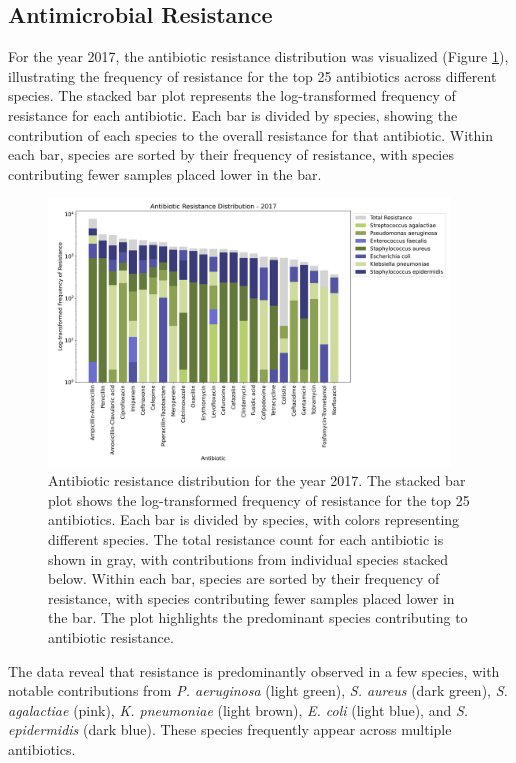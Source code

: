 \documentclass[english,11pt,a4paper,titlepage]{article}
\begin{document}
\subsection*{Antimicrobial Resistance}
For the year 2017, the antibiotic resistance distribution was visualized (Figure \ref{fig:antibiotic_resistance_distribution}), illustrating the frequency of resistance for the top 25 antibiotics across different species. The stacked bar plot represents the log-transformed frequency of resistance for each antibiotic. Each bar is divided by species, showing the contribution of each species to the overall resistance for that antibiotic. Within each bar, species are sorted by their frequency of resistance, with species contributing fewer samples placed lower in the bar.

\begin{figure}[h]
	\centering
	\includegraphics[width=0.95\textwidth]{img/antibiotic_resistance_distribution_filtered_2017.png}
	\caption{Antibiotic resistance distribution for the year 2017. The stacked bar plot shows the log-transformed frequency of resistance for the top 25 antibiotics. Each bar is divided by species, with colors representing different species. The total resistance count for each antibiotic is shown in gray, with contributions from individual species stacked below. Within each bar, species are sorted by their frequency of resistance, with species contributing fewer samples placed lower in the bar. The plot highlights the predominant species contributing to antibiotic resistance.}
	\label{fig:antibiotic_resistance_distribution}
\end{figure}

The data reveal that resistance is predominantly observed in a few species, with notable contributions from \textit{P. aeruginosa} (light green), \textit{S. aureus} (dark green), \textit{S. agalactiae} (pink), \textit{K. pneumoniae} (light brown), \textit{E. coli} (light blue), and \textit{S. epidermidis} (dark blue). These species frequently appear across multiple antibiotics.
\end{document}
